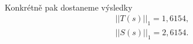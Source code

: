 \documentclass[12pt,a4paper]{article}
\begin{document}
\begin{enumerate}[I.]
\begin{enumerate}[1.]
\begin{gather*}
				\end{gather*}
				Konkrétně pak dostaneme výsledky
				\begin{gather*}
				||T(s)||_1 = 1{,}6154,\\
				||S(s)||_1 = 2{,}6154.
				\end{gather*}
		\end{enumerate}
%		
%		
%		

\end{enumerate}
\end{document}
